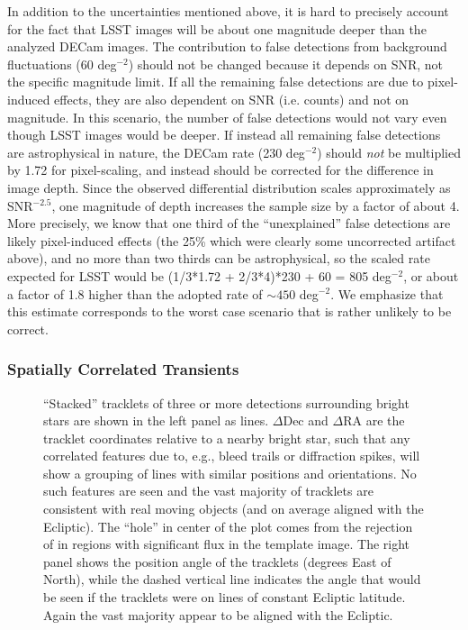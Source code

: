 In addition to the uncertainties mentioned above, it is hard to precisely account for 
the fact that LSST images will be about one magnitude deeper than the analyzed DECam 
images. The contribution to false detections from background fluctuations 
(60 deg$^{-2}$) should not be changed because it depends on SNR, not the
specific magnitude limit. If all the remaining
false detections are due to pixel-induced effects, they are also dependent on SNR 
(i.e. counts) and not on magnitude. In this scenario, the number of false detections
would not vary even though LSST images would be deeper. If instead all remaining 
false detections are astrophysical in nature, the DECam rate (230 deg$^{-2}$) should 
{\it not} be multiplied by 1.72 for pixel-scaling, and instead should be corrected for the 
difference in image depth. Since the observed differential
\DIASource distribution scales approximately as SNR$^{-2.5}$, one magnitude of 
depth increases the sample size by a factor of about 4. More precisely, we know
that one third of the ``unexplained'' false detections are likely pixel-induced effects
(the 25\% which were clearly some uncorrected artifact above),
and no more than two thirds can be astrophysical, so the scaled rate expected
for LSST would be (1/3*1.72 + 2/3*4)*230 + 60 = 805 deg$^{-2}$, or about 
a factor of 1.8 higher than the adopted rate of $\sim450$ deg$^{-2}$. We emphasize
that this estimate corresponds to the worst case scenario that is rather unlikely
to be correct. 
  

\subsubsection{Spatially Correlated Transients}

\begin{figure}
  \centering
  \caption{
   ``Stacked'' tracklets of three or more detections surrounding bright stars are shown in the left panel
  as lines. $\Delta \textrm{Dec}$ and $\Delta \textrm{RA}$ are the tracklet coordinates relative to a nearby
  bright star, such that any correlated features due to, e.g., bleed trails or
  diffraction spikes, will show a grouping of lines with similar positions and
  orientations. No such features are seen and the vast majority of
  tracklets are consistent with real moving objects (and on average aligned with
  the Ecliptic). The ``hole'' in center of the plot comes from the rejection of \DIASources
  in regions with significant flux in the template image. The right panel shows
  the position angle of the tracklets (degrees East of North), while the dashed
  vertical line indicates the angle that would be seen if the tracklets were on
  lines of constant Ecliptic latitude. Again the vast majority appear to be
  aligned with the Ecliptic.
  }
  \label{fig:stacked_tracklets}
\end{figure}

